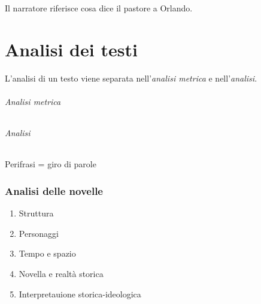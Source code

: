 \documentclass[a4paper]{article}
\begin{document}
\begin{center} %
\begin{minipage}{0.5\textwidth}
\centering
{}
\end{minipage}
\end{center}

\begin{center} %
\begin{minipage}{0.5\textwidth}
\centering
{}
\end{minipage}
\end{center}

Il narratore riferisce cosa dice il pastore a Orlando.

\pagebreak

\part{Analisi dei testi}


L'analisi di un testo viene separata nell'\textit{analisi metrica} e nell'\textit{analisi}.

\paragraph{Analisi metrica}

\phantom{ }\vspace{0.1cm}

\paragraph{Analisi}

Perifrasi = giro di parole

\section{Analisi delle novelle}

\begin{enumerate}
    \item Struttura
    \item Personaggi
    \item Tempo e spazio
    \item Novella e realtà storica
    \item Interpretauione storica-ideologica
\end{enumerate}
\end{document}
